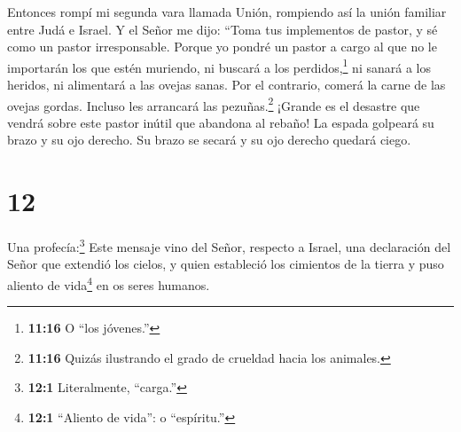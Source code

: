  Entonces rompí mi segunda vara llamada Unión, rompiendo
así la unión familiar entre Judá e Israel.  Y el Señor me
dijo: ``Toma tus implementos de pastor, y sé como un pastor
irresponsable.  Porque yo pondré un pastor a cargo al que
no le importarán los que estén muriendo, ni buscará a los
perdidos,\footnote{\textbf{11:16} O ``los jóvenes.''} ni sanará a los
heridos, ni alimentará a las ovejas sanas. Por el contrario, comerá la
carne de las ovejas gordas. Incluso les arrancará las
pezuñas.\footnote{\textbf{11:16} Quizás ilustrando el grado de crueldad
  hacia los animales.}  ¡Grande es el desastre que vendrá
sobre este pastor inútil que abandona al rebaño! La espada golpeará su
brazo y su ojo derecho. Su brazo se secará y su ojo derecho quedará
ciego.

\hypertarget{section-11}{%
\section{12}\label{section-11}}

 Una profecía:\footnote{\textbf{12:1} Literalmente,
  ``carga.''} Este mensaje vino del Señor, respecto a Israel, una
declaración del Señor que extendió los cielos, y quien estableció los
cimientos de la tierra y puso aliento de vida\footnote{\textbf{12:1}
  ``Aliento de vida'': o ``espíritu.''} en os seres humanos.

